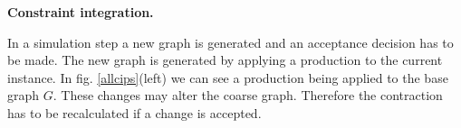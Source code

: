 \documentclass{article}
\begin{document}




\textbf{Constraint integration.}


In a simulation step a new graph is generated and an acceptance decision
has to be made. The new graph is generated by applying a
production to the current instance. 
In fig. \ref{allcips}(left) we can see a production being applied
to the base graph $G$. 
These changes may alter the coarse graph.
Therefore the contraction has to be recalculated if a change is accepted.



\end{document}

